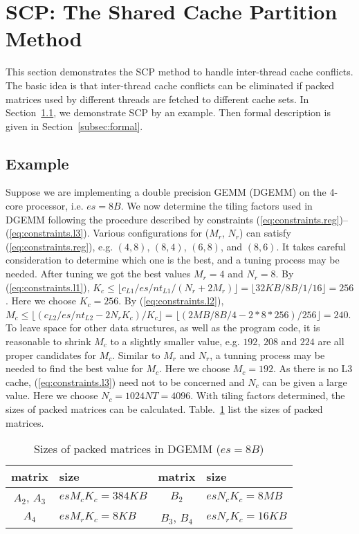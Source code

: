 \section{SCP: The Shared Cache Partition Method}\label{sec:scp}

This section demonstrates the SCP method to handle inter-thread cache conflicts.
The basic idea is that inter-thread cache conflicts can be eliminated
if packed matrices used by different threads are fetched to different cache sets.
In Section~\ref{subsec:example}, we demonstrate SCP by an example.
Then formal description is given in Section~\ref{subsec:formal}.

\subsection{Example}\label{subsec:example}

Suppose we are implementing a double precision GEMM (DGEMM) on
the 4-core processor, i.e. $es=8B$.
We now determine the tiling factors used in DGEMM following the procedure described
by constraints (\ref{eq:constraints.reg})--(\ref{eq:constraints.l3}).
Various configurations for ($M_r$, $N_r$) can satisfy (\ref{eq:constraints.reg}),
e.g. $(4,8)$, $(8,4)$, $(6,8)$, and $(8,6)$. 
It takes careful consideration to determine which one is the best,
and a tuning process may be needed.
After tuning we got the best values $M_r = 4$ and $N_r = 8$.
By (\ref{eq:constraints.l1}),
$K_c \le \lfloor c_{L1}/es/nt_{L1}/(N_r + 2 M_r) \rfloor = \lfloor 32KB/8B/1/16 \rfloor = 256$.
Here we choose $K_c=256$.
By (\ref{eq:constraints.l2}),
$M_c \le \lfloor (c_{L2}/es/nt_{L2} - 2 N_r K_c )/ K_c \rfloor =
\lfloor (2MB/8B/4 - 2*8*256)/256 \rfloor = 240$.
To leave space for other data structures, as well as the program code,
it is reasonable to shrink $M_c$ to a slightly smaller value,
e.g. $192$, $208$ and $224$ are all proper candidates for $M_c$.
Similar to $M_r$ and $N_r$, a tunning process may be needed to
find the best value for $M_c$.
Here we choose $M_c = 192$.
As there is no L3 cache, (\ref{eq:constraints.l3}) need not to be
concerned and $N_c$ can be given a large value.
Here we choose $N_c = 1024NT = 4096$.
With tiling factors determined, the sizes of packed matrices
can be calculated. Table.~\ref{tab:msizes} list the sizes of packed matrices.

\begin{table}
  \centering
  \caption{Sizes of packed matrices in DGEMM ($es = 8B$)}
  \label{tab:msizes}
  \begin{tabular}{cl|cl}
    \toprule
    matrix & size & matrix & size \\
    \midrule
    $A_2$, $A_3$ & $es M_c K_c = 384KB$ & $B_2$ & $es N_c K_c = 8MB$ \\
    $A_4$ & $es M_r K_c = 8KB$   & $B_3$, $B_4$ & $es N_r K_c = 16KB$ \\
    \bottomrule
  \end{tabular}
\end{table}

